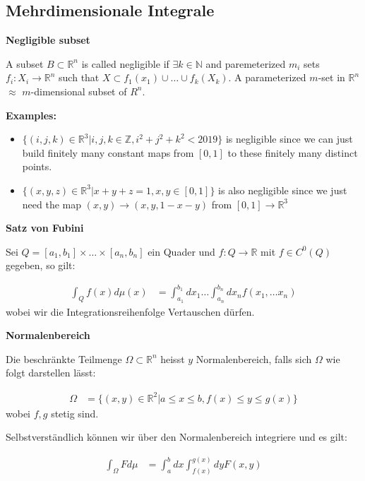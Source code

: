 \documentclass[25pt]{sciposter}
\newcommand{\R}{\mathbb{R}}
\newcommand{\N}{\mathbb{N}}
\newenvironment{method}[1]{\begin{mdframed}[backgroundcolor=blue!10,innertopmargin=15pt, innerbottommargin=15pt, nobreak=true]
		\textbf{#1 }
	}
	{ 
	\end{mdframed}
}
\begin{document}
\begin{multicols}{3}
\section*{Mehrdimensionale Integrale}

\begin{method}{Negligible subset}
	A subset $B \subset \R^n$ is called negligible if $\exists k \in \N$ and paremeterized $m_i$ sets $f_i:X_i \to \R^n$ such that $X\subset f_1(x_1) \cup \ldots \cup f_k(X_k)$.  A parameterized $m$-set in $\R^n$ $\approx$ $m$-dimensional subset of $R^n$.
\end{method}
\textbf{Examples:}

\begin{itemize}
	\item $\{(i,j,k)\in\R^3 | i,j,k\in\mathbb{Z} , i^2 + j^2 + k^2 < 2019\}$ is negligible since we can just build finitely many constant maps from $[0,1]$ to these finitely many distinct points.
	\item $\{(x,y,z)\in\R^3 | x+y+z=1 ,x,y\in\left[0,1\right]\}$ is also negligible since we just need the map $(x,y)\to (x,y,1-x-y)$ from $\left[0,1\right]\to\R^3$
\end{itemize}

\begin{method}{Satz von Fubini}
	Sei $Q=[a_1,b_1]\times \ldots \times [a_n,b_n]$ ein Quader und $f:Q\to \R$ mit $f\in C^0(Q)$ gegeben, so gilt:
	
	\begin{align*}
		\int_Q f(x) d\mu(x) &= \int_{a_1}^{b_1} dx_1 \ldots \int_{a_n}^{b_n} dx_n f(x_1,\ldots x_n)
	\end{align*}
	wobei wir die Integrationsreihenfolge Vertauschen dürfen.
\end{method}


\begin{method}{Normalenbereich}
	Die beschränkte Teilmenge $\Omega \subset \R^n$ heisst $y$ Normalenbereich, falls sich $\Omega$ wie folgt darstellen lässt:
	
	\begin{align*}
		\Omega &= \{(x,y)\in\R^2 | a \leq x \leq b, f(x)\leq y \leq g(x)\}
	\end{align*}
	wobei $f,g$ stetig sind.
	
	Selbstverständlich können wir über den Normalenbereich integriere und es gilt:
	
	\begin{align*}
		\int_\Omega F d\mu &= \int_{a}^{b} dx \int_{f(x)}^{g(x)} dy F(x,y)
	\end{align*}
	

\end{method}
\end{multicols}
\end{document}
